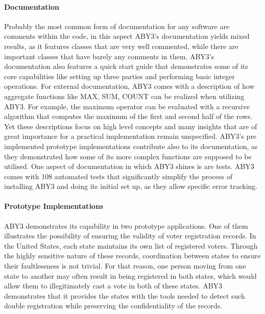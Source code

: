 \paragraph{Documentation} 
Probably the most common form of documentation for any software are comments within the code, in this aspect ABY3's documentation  yields mixed results, as it features classes that are very well commented, while there are important classes that have barely any comments in them. 
ABY3's documentation also features a quick start guide that demonstrates some of its core capabilities like setting up three parties and performing basic integer operations.
For external documentation, ABY3 comes with a description of how aggregate functions like MAX, SUM, COUNT can be realized when utilizing ABY3. For example, the maximum operator can be evaluated with a recursive algorithm that computes the maximum of the first and second half of the rows. Yet these descriptions focus on high level concepts and many insights that are of great importance for a practical implementation remain unspecified. ABY3's pre implemented prototype implementations contribute also to its documentation, as they demonstrated how some of its more complex functions are supposed to be utilised. One aspect of documentation in which ABY3 shines is are tests. ABY3 comes with 108 automated tests that significantly simplify the process of installing ABY3 and doing its initial set up, as they allow specific error tracking.  
\paragraph{Prototype Implementations}
ABY3 demonstrates its capability in two prototype applications. One of them illustrates the possibility of ensuring the validity of voter registration records. In the United States, each state maintains its own list of registered voters. Through the highly sensitive nature of these records, coordination between states to ensure their faultlessness is not trivial. For that reason, one person moving from one state to another may often result in being registered in both states, which would allow them to illegitimately cast a vote in both of these states.
ABY3 demonstrates that it provides the states with  the tools needed to detect such double registration while preserving the confidentiality of the records. 
  


